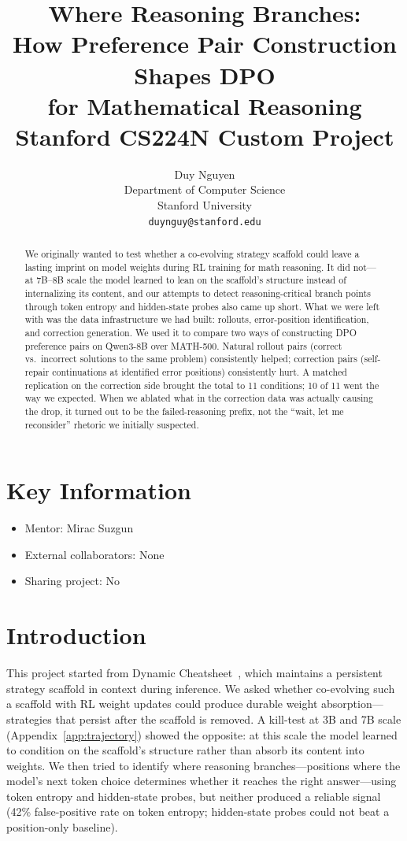 \documentclass{article}
\title{
  Where Reasoning Branches: \\
  How Preference Pair Construction Shapes DPO \\
  for Mathematical Reasoning \\
  \vspace{1em}
  \small{\normalfont Stanford CS224N Custom Project}
}
\author{
  Duy Nguyen \\
  Department of Computer Science \\
  Stanford University \\
  \texttt{duynguy@stanford.edu}
}
\begin{document}
\maketitle

\begin{abstract}
We originally wanted to test whether a co-evolving strategy scaffold could leave a lasting imprint on model weights during RL training for math reasoning.
It did not---at 7B--8B scale the model learned to lean on the scaffold's structure instead of internalizing its content, and our attempts to detect reasoning-critical branch points through token entropy and hidden-state probes also came up short.
What we were left with was the data infrastructure we had built: rollouts, error-position identification, and correction generation.
We used it to compare two ways of constructing DPO preference pairs on Qwen3-8B over MATH-500.
Natural rollout pairs (correct vs.\ incorrect solutions to the same problem) consistently helped; correction pairs (self-repair continuations at identified error positions) consistently hurt.
A matched replication on the correction side brought the total to 11 conditions; 10 of 11 went the way we expected.
When we ablated what in the correction data was actually causing the drop, it turned out to be the failed-reasoning prefix, not the ``wait, let me reconsider'' rhetoric we initially suspected.
\end{abstract}

\section{Key Information}
\begin{itemize}
    \item Mentor: Mirac Suzgun
    \item External collaborators: None
    \item Sharing project: No
\end{itemize}

\section{Introduction}
\label{sec:intro}

This project started from Dynamic Cheatsheet~\cite{suzgun2025dc}, which maintains a persistent strategy scaffold in context during inference.
We asked whether co-evolving such a scaffold with RL weight updates could produce durable weight absorption---strategies that persist after the scaffold is removed.
A kill-test at 3B and 7B scale (Appendix~\ref{app:trajectory}) showed the opposite: at this scale the model learned to condition on the scaffold's structure rather than absorb its content into weights.
We then tried to identify where reasoning branches---positions where the model's next token choice determines whether it reaches the right answer---using token entropy and hidden-state probes, but neither produced a reliable signal (42\% false-positive rate on token entropy; hidden-state probes could not beat a position-only baseline).
\end{document}
